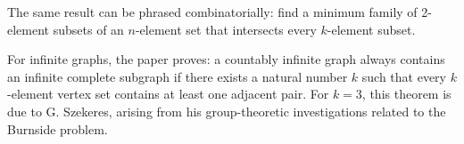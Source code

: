 \documentclass[11pt]{article}
\begin{document}
The same result can be phrased combinatorially: find a minimum family of 2-element subsets of an $n$-element set that intersects every $k$-element subset.

For infinite graphs, the paper proves: a countably infinite graph always contains an infinite complete subgraph if there exists a natural number $k$ such that every $k$-element vertex set contains at least one adjacent pair. For $k=3$, this theorem is due to G. Szekeres, arising from his group-theoretic investigations related to the Burnside problem.
\end{document}
